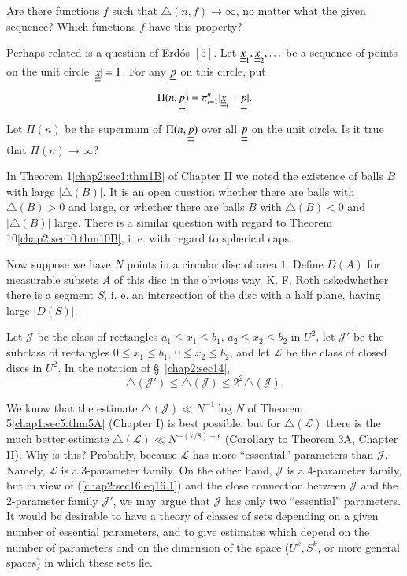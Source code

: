 Are there functions $f$ such that $\triangle(n, f) \to \infty$, no matter what the given sequence? Which functions $f$ have this property?

Perhaps related is a question of Erd\'{o}s $[5]$. Let $\underline{\underline{x}}_{1}, \underline{\underline{x}}_{2}, \ldots$ be a sequence of points on the unit circle $|\underline{\underline{x}}| = 1$. For any $\underline{\underline{p}}$ on this circle, put
$$
\Pi(n, \underline{\underline{p}}) = \pi_{i=1}^{n} |\underline{\underline{x}}_{i} - \underline{\underline{p}}|.
$$ 

Let $\Pi(n)$ be the supermum of $\Pi(n, \underline{\underline{p}})$ over all $\underline{\underline{p}}$ on the unit circle. Is it true that $\Pi(n) \to \infty$?

In Theorem 1\ref{chap2:sec1:thm1B} of Chapter II we noted the existence of balls $B$ with large $|\triangle (B)|$. It is an open question whether there are balls with $\triangle(B) > 0$ and large, or whether there are balls $B$ with $\triangle(B) < 0$ and $|\triangle(B)|$ large. There is a similar question with regard to Theorem 10\ref{chap2:sec10:thm10B}, i. e. with regard to spherical caps.

Now suppose we have $N$ points in a circular disc of area $1$. Define $D(A)$ for measurable subsets $A$ of this disc in the obvious way. K. F. Roth asked\pageoriginale whether there is a segment $S$, i. e. an intersection of the disc with a half plane, having large $|D(S)|$.

Let $\mathscr{J}$ be the class of rectangles $a_{1} \leq x_{1} \leq b_{1}$, $a_{2} \leq x_{2} \leq b_{2}$ in $U^{2}$, let $\mathscr{J}'$ be the subclass of rectangles $0 \leq x_{1} \leq b_{1}$, $0 \leq x_{2} \leq b_{2}$, and let $\mathscr{L}$ be the class of closed discs in $U^{2}$. In the notation of \S\ \ref{chap2:sec14},
\begin{equation*}
\triangle (\mathscr{J}') \leq \triangle (\mathscr{J}) \leq 2^{2} \triangle (\mathscr{J}).\tag{16.1}\label{chap2:sec16:eq16.1}
\end{equation*}

We know that the estimate $\triangle(\mathscr{J}) \ll N^{-1} \log N$ of Theorem 5\ref{chap1:sec5:thm5A} (Chapter I) is best possible, but for $\triangle(\mathscr{L})$ there is the much better estimate $\triangle(\mathscr{L}) \ll N^{-(7/8)-\epsilon}$ (Corollary to Theorem 3A, Chapter II). Why is this? Probably, because $\mathscr{L}$ has more ``essential'' parameters than $\mathscr{J}$. Namely, $\mathscr{L}$ is a 3-parameter family. On the other hand, $\mathscr{J}$ is a 4-parameter family, but in view of (\ref{chap2:sec16:eq16.1}) and  the close connection between $\mathscr{J}$ and the 2-parameter family $\mathscr{J}'$, we may argue that $\mathscr{J}$ has only two ``essential'' parameters. It would be desirable to have a theory of classes of sets depending on a given number of essential parameters, and to give estimates which depend on the number of parameters and on the dimension of the space ($U^{k}, S^{k}$, or more general spaces) in which these sets lie.

